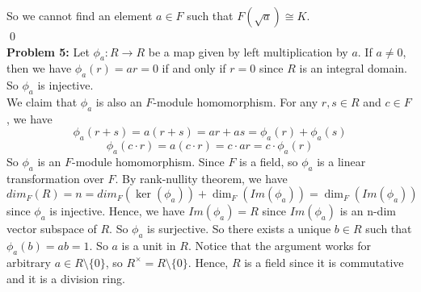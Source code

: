\documentclass[12pt]{amsart}
\begin{document}
So we cannot find an element $a\in F$ such that $F(\sqrt{a})\cong K$.
\\\qed\\
\textbf{Problem 5:} Let $\phi_a:R\to R$ be a map given by left multiplication by $a$. If $a\neq 0$, then we have $\phi_a(r)=ar=0$ if and only if $r=0$ since $R$ is an integral domain. So $\phi_a$ is injective.\\
We claim that $\phi_a$ is also an $F$-module homomorphism. For any $r,s\in R$ and $c\in F$, we have
\[\phi_a(r+s)=a(r+s)=ar+as=\phi_a(r)+\phi_a(s)\]
\[\phi_a(c\cdot r)=a(c\cdot r)=c\cdot ar=c\cdot \phi_a(r)\]
So $\phi_a$ is an $F$-module homomorphism. Since $F$ is a field, so $\phi_a$ is a linear transformation over $F$. By rank-nullity theorem, we have 
$$dim_F(R)=n=dim_F(\ker(\phi_a))+\dim_F(Im(\phi_a))=\dim_F(Im(\phi_a))$$
since $\phi_a$ is injective. Hence, we have $Im(\phi_a)=R$ since $Im(\phi_a)$ is an n-dim vector subspace of $R$.
So $\phi_a$ is surjective. So there exists a unique $b\in R$ such that $\phi_a(b)=ab=1$. So $a$ is a unit in $R$. Notice that the argument works for arbitrary $a\in R\setminus\{0\}$, so $R^\times =R\setminus\{0\}$. Hence, $R$ is a field since it is commutative and it is a division ring.
\end{document}
